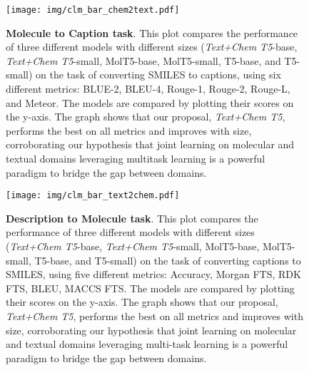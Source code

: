 \documentclass[nohyperref]{article}
\theoremstyle{plain}
\theoremstyle{definition}
\theoremstyle{remark}
\begin{document}
\begin{figure}[ht]
    \centering
    \texttt{[image: img/clm\_bar\_chem2text.pdf]}
    \caption{\textbf{Molecule to Caption task}.
    This plot compares the performance of three different models with different sizes (\emph{Text+Chem T5}-base, \emph{Text+Chem T5}-small, MolT5-base, MolT5-small, T5-base, and T5-small) on the task of converting SMILES to captions, using six different metrics: BLUE-2, BLEU-4, Rouge-1, Rouge-2, Rouge-L, and Meteor. The models are compared by plotting their scores on the y-axis. The graph shows that our proposal, \emph{Text+Chem T5}, performs the best on all metrics and improves with size, corroborating our hypothesis that joint learning on molecular and textual domains leveraging multitask learning is a powerful paradigm to bridge the gap between domains.}
    \label{fig:mol2text_figure1}
\end{figure}
\begin{figure}[ht]
    \centering
    \texttt{[image: img/clm\_bar\_text2chem.pdf]}
    \caption{\textbf{Description to Molecule task}.
    This plot compares the performance of three different models with different sizes (\emph{Text+Chem T5}-base, \emph{Text+Chem T5}-small, MolT5-base, MolT5-small, T5-base, and T5-small) on the task of converting captions to SMILES, using five different metrics: Accuracy, Morgan FTS, RDK FTS, BLEU, MACCS FTS. The models are compared by plotting their scores on the y-axis. The graph shows that our proposal, \emph{Text+Chem T5}, performs the best on all metrics and improves with size, corroborating our hypothesis that joint learning on molecular and textual domains leveraging multi-task learning is a powerful paradigm to bridge the gap between domains.}
    \label{fig:text2mol_figure1}
\end{figure}
\end{document}
